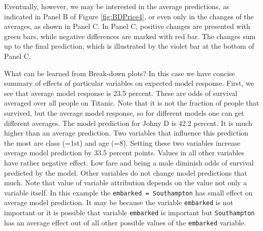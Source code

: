 \documentclass[]{krantz}
\begin{document}
Eventually, however, we may be interested in the average predictions, as indicated in Panel B of Figure \ref{fig:BDPrice4}, or even only in the changes of the averages, as shown in Panel C. In Panel C, positive changes are presented with green bars, while negative differences are marked with red bar.
The changes sum up to the final prediction, which is illustrated by the violet bar at the bottom of Panel C.

What can be learned from Break-down plots? In this case we have concise summary of effects of particular variables on expected model response.
First, we see that average model response is 23.5 percent. These are odds of survival averaged over all people on Titanic. Note that it is not the fraction of people that survived, but the average model response, so for different models one can get different averages.
The model prediction for Johny D is 42.2 percent. It is much higher than an average prediction. Two variables that influence this prediction the most are class (=1st) and age (=8). Setting these two variables increase average model prediction by 33.5 percent points. Values in all other variables have rather negative effect. Low fare and being a male diminish odds of survival predicted by the model. Other variables do not change model predictions that much.
Note that value of variable attribution depends on the value not only a variable itself. In this example the \texttt{embarked\ =\ Southampton} has small effect on average model prediction. It may be because the variable \texttt{embarked} is not important or it is possible that variable \texttt{embarked} is important but \texttt{Southampton} has an average effect out of all other possible values of the \texttt{embarked} variable.
\end{document}
